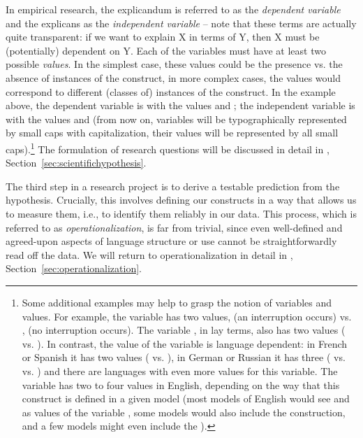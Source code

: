 In empirical research, the explicandum is referred to as the \emph{dependent variable} and the explicans as the \emph{independent variable} -- note that these terms are actually quite transparent: if we want to explain  X in terms of Y, then X must be (potentially) dependent on Y. Each of the variables must have at least two possible \emph{values}. In the simplest case, these values could be the presence vs. the absence of instances of the construct, in more complex cases, the values would correspond to different (classes of) instances of the construct. In the example above, the dependent variable is  with the values  and ; the independent variable is   with the values   and   (from now on, variables will be typographically represented by small caps with capitalization, their values will be represented by all small caps).\footnote{Some additional examples may help to grasp the notion of variables and values. For example, the variable  has two values,  (an interruption occurs) vs. , (no interruption occurs). The variable , in lay terms, also has two values ( vs. ). In contrast, the value of the variable  is language dependent: in French or Spanish it has two values ( vs. ), in German or Russian it has three ( vs.  vs. ) and there are languages with even more values for this variable. The variable  has two to four values in English, depending on the way that this construct is defined in a given model (most models of English would see  and   as values of the variable , some models would also include the  construction, and a few models might even include the ).} The formulation of research questions will be discussed in detail in , Section~\ref{sec:scientifichypothesis}.

The third step in a research project is to derive a testable prediction from the hypothesis.  Crucially, this involves defining our constructs in a way that allows us to measure  them, i.e., to identify them reliably  in our data. This process, which is referred to as \emph{operationalization},  is far from trivial, since even well\hyp{}defined and agreed\hyp{}upon aspects of language structure or use cannot be straightforwardly read off the data. We will return to operationalization in detail in , Section~\ref{sec:operationalization}.

